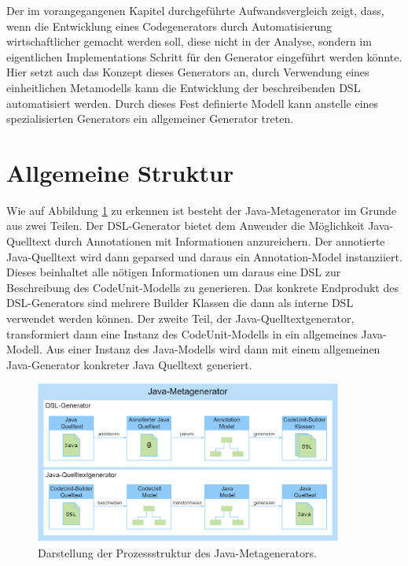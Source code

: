 \documentclass[12pt,oneside,a4paper,parskip]{scrbook}
\begin{document}
Der im vorangegangenen Kapitel durchgeführte Aufwandsvergleich zeigt, dass, wenn die Entwicklung eines Codegenerators durch Automatisierung wirtschaftlicher gemacht werden soll, diese nicht in der Analyse, sondern im eigentlichen Implementations Schritt für den Generator eingeführt werden könnte. Hier setzt auch das Konzept dieses Generators an, durch Verwendung eines einheitlichen Metamodells  kann die Entwicklung der beschreibenden DSL automatisiert werden. Durch dieses Fest definierte Modell kann anstelle eines spezialisierten Generators ein allgemeiner Generator treten.

\section{Allgemeine Struktur}

Wie auf Abbildung \ref{fig:meta1} zu erkennen ist besteht der Java-Metagenerator im Grunde aus zwei Teilen. Der DSL-Generator bietet dem Anwender die Möglichkeit Java-Quelltext durch Annotationen mit Informationen anzureichern. Der annotierte Java-Quelltext wird dann geparsed und daraus ein Annotation-Model instanziiert. Dieses beinhaltet alle nötigen Informationen um daraus eine DSL zur Beschreibung des CodeUnit-Modells zu generieren. Das konkrete Endprodukt des DSL-Generators sind mehrere Builder Klassen die dann als interne DSL verwendet werden können. Der zweite Teil, der Java-Quelltextgenerator, transformiert dann eine Instanz des CodeUnit-Modells in ein allgemeines Java-Modell. Aus einer Instanz des Java-Modells wird dann mit einem allgemeinen Java-Generator konkreter Java Quelltext generiert.

\begin{figure}[htbp]
	\centering
	\includegraphics[width=0.9\textwidth]{bilder/metagenProzess}
	\caption{Darstellung der Prozessstruktur des Java-Metagenerators.}
	\label{fig:meta1}
\end{figure}
\end{document}
